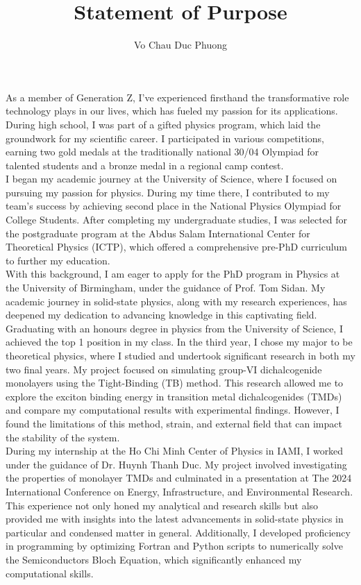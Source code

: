 \documentclass[a4paper]{article}
\title{Statement of Purpose}
\author{Vo Chau Duc Phuong}
\begin{document}
\maketitle
\quad As a member of Generation Z, I've experienced firsthand the transformative role technology plays in our lives, which has fueled my passion for its applications. During high school, I was part of a gifted physics program, which laid the groundwork for my scientific career. I participated in various competitions, earning two gold medals at the traditionally national 30/04 Olympiad for talented students and a bronze medal in a regional camp contest. \\\null\quad
I began my academic journey at the University of Science, where I focused on pursuing my passion for physics. During my time there, I contributed to my team’s success by achieving second place in the National Physics Olympiad for College Students. After completing my undergraduate studies, I was selected for the postgraduate program at the Abdus Salam International Center for Theoretical Physics (ICTP), which offered a comprehensive pre-PhD curriculum to further my education. \\\null\quad
With this background, I am eager to apply for the PhD program in Physics at the University of Birmingham, under the guidance of Prof. Tom Sidan. My academic journey in solid-state physics, along with my research experiences, has deepened my dedication to advancing knowledge in this captivating field.\\\null\quad
Graduating with an honours degree in physics from the University of Science, I achieved the top 1 position in my class. In the third year, I chose my major to be theoretical physics, where I studied and undertook significant research in both my two final years. My project focused on simulating group-VI dichalcogenide monolayers using the Tight-Binding (TB) method. This research allowed me to explore the exciton binding energy in transition metal dichalcogenides (TMDs) and compare my computational results with experimental findings. However, I found the limitations of this method, strain, and external field that can impact the stability of the system.\\\null\quad
During my internship at the Ho Chi Minh Center of Physics in IAMI, I worked under the guidance of Dr. Huynh Thanh Duc. My project involved investigating the properties of monolayer TMDs and culminated in a presentation at The 2024 International Conference on Energy, Infrastructure, and Environmental Research. This experience not only honed my analytical and research skills but also provided me with insights into the latest advancements in solid-state physics in particular and condensed matter in general. Additionally, I developed proficiency in programming by optimizing Fortran and Python scripts to numerically solve the Semiconductors Bloch Equation, which significantly enhanced my computational skills.\\\null\quad
\end{document}
